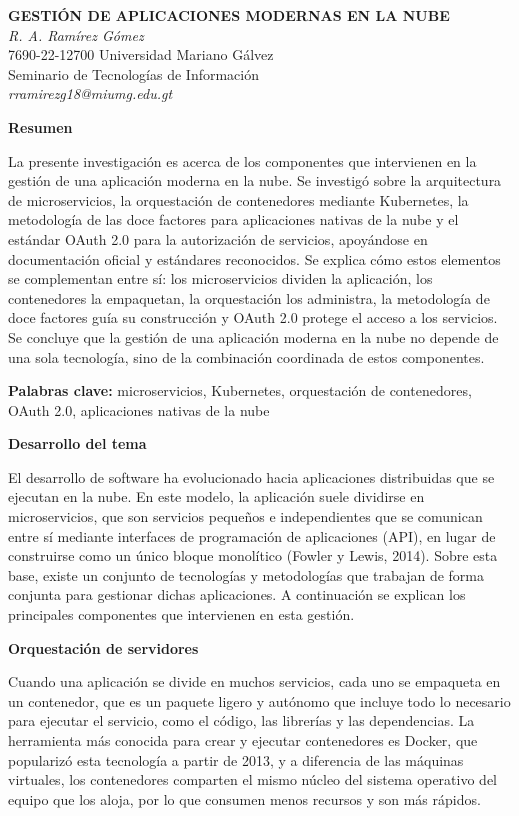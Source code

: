 \documentclass[12pt,letterpaper]{article}
\newcommand{\subtitulo}[1]{\vspace{12pt}\noindent\textbf{#1}\par\vspace{10pt}}
\begin{document}
\begin{center}
\textbf{GESTIÓN DE APLICACIONES MODERNAS EN LA NUBE}\\[8pt]
\textit{R. A. Ramírez Gómez}\\
7690-22-12700 Universidad Mariano Gálvez\\
Seminario de Tecnologías de Información\\
\textit{rramirezg18@miumg.edu.gt}
\end{center}

\vspace{10pt}

\subtitulo{Resumen}
La presente investigación es acerca de los componentes que intervienen en la gestión de una aplicación moderna en la nube. Se investigó sobre la arquitectura de microservicios, la orquestación de contenedores mediante Kubernetes, la metodología de las doce factores para aplicaciones nativas de la nube y el estándar OAuth 2.0 para la autorización de servicios, apoyándose en documentación oficial y estándares reconocidos. Se explica cómo estos elementos se complementan entre sí: los microservicios dividen la aplicación, los contenedores la empaquetan, la orquestación los administra, la metodología de doce factores guía su construcción y OAuth 2.0 protege el acceso a los servicios. Se concluye que la gestión de una aplicación moderna en la nube no depende de una sola tecnología, sino de la combinación coordinada de estos componentes.

\noindent\textbf{Palabras clave:} microservicios, Kubernetes, orquestación de contenedores, OAuth 2.0, aplicaciones nativas de la nube

\subtitulo{Desarrollo del tema}
El desarrollo de software ha evolucionado hacia aplicaciones distribuidas que se ejecutan en la nube. En este modelo, la aplicación suele dividirse en microservicios, que son servicios pequeños e independientes que se comunican entre sí mediante interfaces de programación de aplicaciones (API), en lugar de construirse como un único bloque monolítico (Fowler y Lewis, 2014). Sobre esta base, existe un conjunto de tecnologías y metodologías que trabajan de forma conjunta para gestionar dichas aplicaciones. A continuación se explican los principales componentes que intervienen en esta gestión.

\subtitulo{Orquestación de servidores}
Cuando una aplicación se divide en muchos servicios, cada uno se empaqueta en un contenedor, que es un paquete ligero y autónomo que incluye todo lo necesario para ejecutar el servicio, como el código, las librerías y las dependencias. La herramienta más conocida para crear y ejecutar contenedores es Docker, que popularizó esta tecnología a partir de 2013, y a diferencia de las máquinas virtuales, los contenedores comparten el mismo núcleo del sistema operativo del equipo que los aloja, por lo que consumen menos recursos y son más rápidos.
\end{document}
